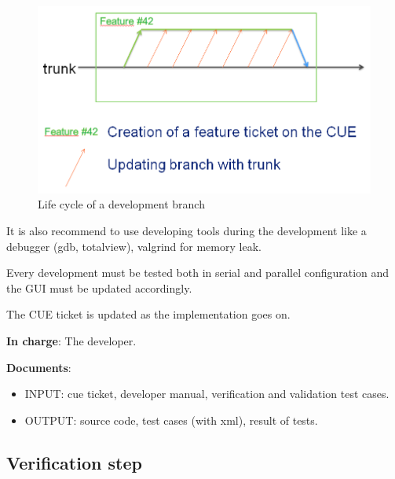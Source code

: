 \begin{figure}[H]
\centering
\includegraphics[scale=.4]{graphics/feature_svn.png}
\caption{\label{fig_feature} Life cycle of a development branch}
\end{figure}

It is also recommend to use developing tools during the development like a
debugger (gdb, totalview), valgrind for memory leak.

Every development must be tested both in serial and parallel configuration and
the GUI must be updated accordingly.

The CUE ticket is updated as the implementation goes on.

\textbf{In charge}: The developer.

\textbf{Documents}: 
\begin{itemize}
\item INPUT: cue ticket, developer manual, verification and validation test cases.
\item OUTPUT: source code, test cases (with xml), result of tests.
\end{itemize}

\subsection{Verification step}

